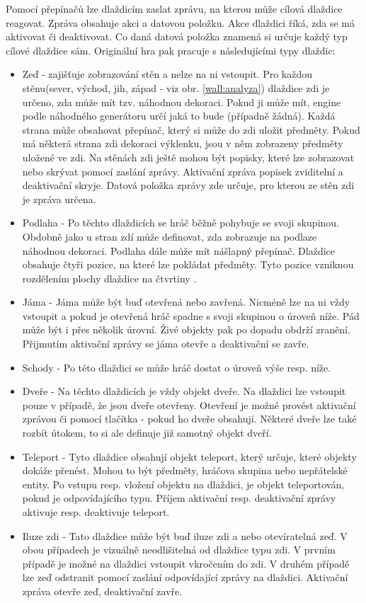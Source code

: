 Pomocí přepínačů lze dlaždicím zaslat zprávu, na kterou může cílová dlaždice reagovat. Zpráva obsahuje akci a datovou položku. 
Akce dlaždici říká, zda se má aktivovat či deaktivovat. Co daná datová položka znamená si určuje každý typ cílové dlaždice sám. 
Originální hra pak pracuje s následujícími typy dlaždic:
\begin{itemize}
\item Zeď - zajišťuje zobrazování stěn a nelze na ni vstoupit. Pro každou stěnu(sever, východ, jih, západ - viz obr. \ref{wall:analyza}) dlaždice zdi
	je určeno, zda může mít tzv. náhodnou dekoraci. Pokud ji může mít, engine podle náhodného generátoru
	určí jaká to bude (případně žádná). Každá strana může obsahovat přepínač, který si může do zdi uložit předměty.
	Pokud má některá strana zdi dekoraci výklenku, jsou v něm zobrazeny předměty uložené ve zdi.
	Na stěnách zdi ještě mohou být popisky, které lze zobrazovat nebo skrývat pomocí zaslání zprávy. Aktivační zpráva 
	popisek zviditelní a deaktivační skryje. Datová položka zprávy zde určuje, pro kterou ze stěn zdi je zpráva určena.

\item Podlaha - Po těchto dlaždicích se hráč běžně pohybuje se svoji skupinou. Obdobně jako u stran zdí může definovat,
	zda zobrazuje na podlaze náhodnou dekoraci. Podlaha dále může mít nášlapný přepínač. Dlaždice obsahuje čtyři pozice,
	na které lze pokládat předměty. Tyto pozice vzniknou rozdělením plochy dlaždice na čtvrtiny .


\item Jáma - Jáma může být buď otevřená nebo zavřená. Nicméně lze na ni vždy vstoupit a pokud je otevřená 
	hráč spadne s svoji skupinou o úroveň níže. Pád může být i přes několik úrovní. Živé objekty pak po
	dopadu obdrží zranění. Přijmutím aktivační zprávy se jáma otevře a deaktivační se zavře.

\item Schody - Po této dlaždici se může hráč dostat o úroveň výše resp. níže.

\item Dveře - Na těchto dlaždicích je vždy objekt dveře. Na dlaždici lze vstoupit pouze v případě, že jsou dveře
	otevřeny. Otevření je možné provést aktivační zprávou či pomocí tlačítka - pokud ho dveře obsahují. 
	Některé dveře lze také rozbít útokem, to si ale definuje již samotný objekt dveří.

\item Teleport - Tyto dlaždice obsahují objekt teleport, který určuje, které objekty dokáže přenést. Mohou to být
	předměty, hráčova skupina nebo nepřátelské entity. Po vstupu resp. vložení objektu na dlaždici, je objekt teleportován, pokud
	je odpovídajícího typu. Příjem aktivační resp. deaktivační zprávy aktivuje resp. deaktivuje teleport.

\item Iluze zdi - Tato dlaždice může být buď iluze zdi a nebo otevíratelná zeď. V obou případech je vizuálně neodlišitelná
	od dlaždice typu zdi. V prvním případě je možné na dlaždici vstoupit vkročením do zdi. V druhém případě lze
	zeď odstranit pomocí zaslání odpovídající zprávy na dlaždici. Aktivační zpráva otevře zeď, deaktivační zavře.
\end{itemize}

